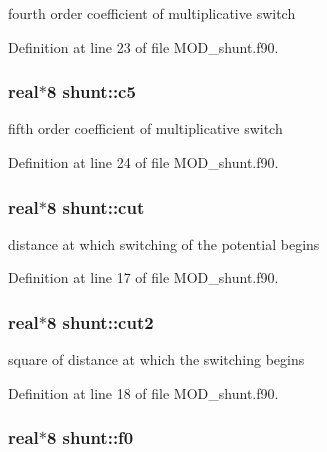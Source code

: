 fourth order coefficient of multiplicative switch 



Definition at line 23 of file M\-O\-D\-\_\-shunt.\-f90.

\hypertarget{classshunt_a9de80047e037b8994437ddf76355aed4}{
\subsubsection[{c5}]{\setlength{\rightskip}{0pt plus 5cm}real$\ast$8 shunt\-::c5}}\label{classshunt_a9de80047e037b8994437ddf76355aed4}


fifth order coefficient of multiplicative switch 



Definition at line 24 of file M\-O\-D\-\_\-shunt.\-f90.

\hypertarget{classshunt_a168837ca6103076f7e7817b18737780c}{
\subsubsection[{cut}]{\setlength{\rightskip}{0pt plus 5cm}real$\ast$8 shunt\-::cut}}\label{classshunt_a168837ca6103076f7e7817b18737780c}


distance at which switching of the potential begins 



Definition at line 17 of file M\-O\-D\-\_\-shunt.\-f90.

\hypertarget{classshunt_ac798484b6bbe20287e81c534f0989db9}{
\subsubsection[{cut2}]{\setlength{\rightskip}{0pt plus 5cm}real$\ast$8 shunt\-::cut2}}\label{classshunt_ac798484b6bbe20287e81c534f0989db9}


square of distance at which the switching begins 



Definition at line 18 of file M\-O\-D\-\_\-shunt.\-f90.

\hypertarget{classshunt_a49fe4b8934cbab0b3913f62b2af5e672}{
\subsubsection[{f0}]{\setlength{\rightskip}{0pt plus 5cm}real$\ast$8 shunt\-::f0}}\label{classshunt_a49fe4b8934cbab0b3913f62b2af5e672}



